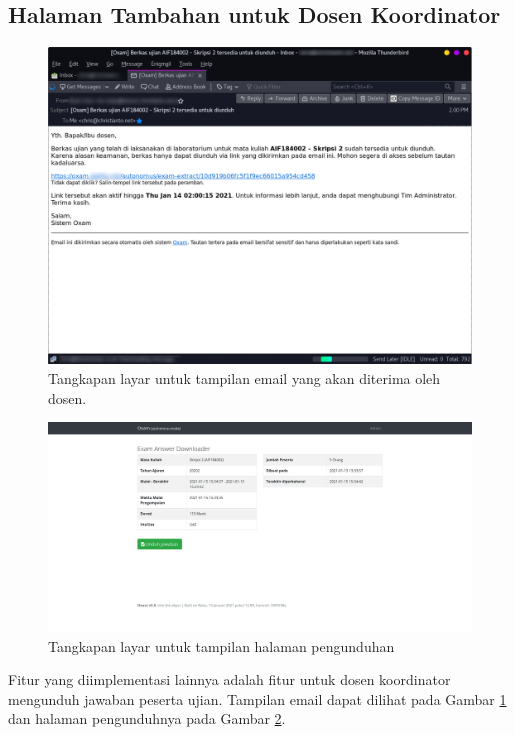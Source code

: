     \subsection{Halaman Tambahan untuk Dosen Koordinator}
    \begin{figure}
        \centering
        \includegraphics[width=0.7\paperwidth]{Gambar/implemented-interface/extra/extractor-email.png}
        \caption{Tangkapan layar untuk tampilan email yang akan diterima oleh dosen.}
        \label{fig:screenshot-extra-email}
    \end{figure}
    \begin{figure}
        \centering
        \includegraphics[width=0.7\paperwidth]{Gambar/implemented-interface/extra/extractor-page.png}
        \caption{Tangkapan layar untuk tampilan halaman pengunduhan}
        \label{fig:screenshot-extra-page}
    \end{figure}
    Fitur yang diimplementasi lainnya adalah fitur untuk dosen koordinator mengunduh jawaban peserta ujian.
    Tampilan email dapat dilihat pada Gambar \ref{fig:screenshot-extra-email} dan 
    halaman pengunduhnya pada Gambar \ref{fig:screenshot-extra-page}.

